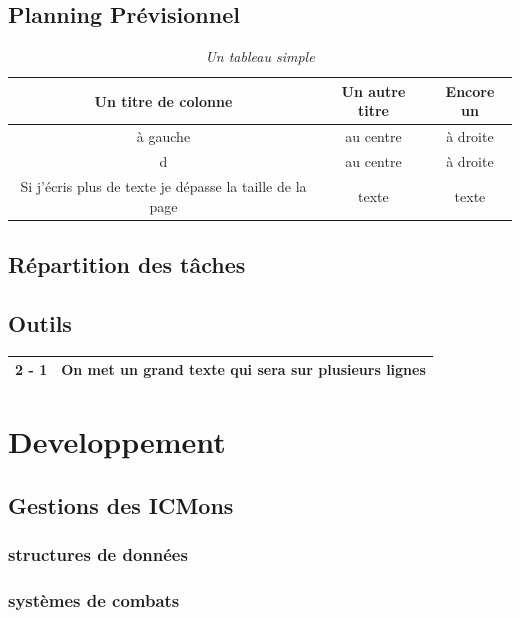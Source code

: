 \documentclass[12pt,a4paper, twoside]{article}
\begin{document}
\subsection{Planning Prévisionnel}
\begin{table}[h]
    \centering
    \begin{tabular}{|c|c|c|}
        \hline
        Un titre de colonne & Un autre titre & Encore un \\
        \hline
        à gauche & au centre & à droite \\
        \hline
        d & au centre & à droite \\
        \hline
        Si j'écris plus de texte je dépasse la taille de la page & texte & texte \\
        \hline
    \end{tabular}
    \vspace{1cm}
    \caption{\emph{Un tableau simple}}
    \label{tab:test}
\end{table}

\subsection{Répartition des tâches}
\subsection{Outils}
\newpage
\begin{center}
\begin{tabular}{|c|p{8cm}|}
\hline
2 - 1 & On met un grand texte qui sera sur plusieurs lignes \\
\hline
\end{tabular}
\end{center}

\section{Developpement}
\subsection{Gestions des ICMons}
    \subsubsection{structures de données}
    \subsubsection{systèmes de combats}
\newpage
\end{document}

